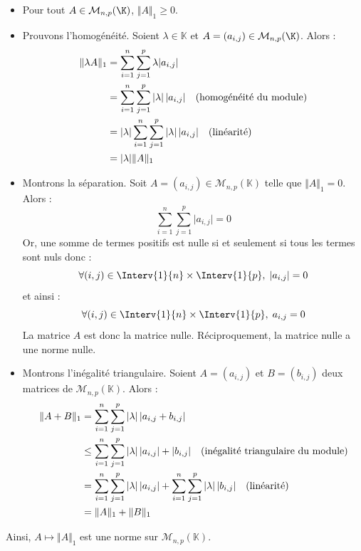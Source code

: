 \documentclass[a4paper,10pt]{report}
\begin{document}
\begin{itemize}
\item Pour tout $A \in \mathcal{M}_{n,p}(\K)$, $\Vert A \Vert_{1} \geq 0$.
\item Prouvons l'homogénéité. Soient $\lambda \in \mathbb{K}$ et $A=(a_{i,j}) \in \mathcal{M}_{n,p}(\K)$. Alors :
\begin{align*}
\Vert \lambda A \Vert_1 & = \sum_{i = 1}^{n} \sum_{j = 1}^{p} \lambda \vert a_{i,j} \vert \\
& = \sum_{i = 1}^{n} \sum_{j = 1}^{p} \vert \lambda \vert \, \vert a_{i,j} \vert \quad \hbox{(homogénéité du module)} \\
& = \vert \lambda \vert  \sum_{i = 1}^{n} \sum_{j = 1}^{p} \vert \lambda \vert \, \vert a_{i,j} \vert  \quad \hbox{(linéarité)} \\
& = \vert \lambda \vert \Vert A \Vert_1 
\end{align*}
\item Montrons la séparation. Soit $A=(a_{i,j}) \in \mathcal{M}_{n,p}(\mathbb{K})$ telle que $\Vert A \Vert_1=0$. Alors :
$$ \sum_{i = 1}^{n} \sum_{j = 1}^{p} \vert a_{i,j} \vert =0$$
Or, une somme de termes positifs est nulle si et seulement si tous les termes sont nuls donc :
$$ \forall (i,j) \in \Interv{1}{n} \times \Interv{1}{p}, \; \vert a_{i,j} \vert =0$$
et ainsi :
$$  \forall (i,j) \in \Interv{1}{n} \times \Interv{1}{p}, \;  a_{i,j}  =0$$
La matrice $A$ est donc la matrice nulle. Réciproquement, la matrice nulle a une norme nulle.
\item Montrons l'inégalité triangulaire. Soient $A=(a_{i,j})$ et $B=(b_{i,j})$ deux matrices de $\mathcal{M}_{n,p}(\mathbb{K})$. Alors :
\begin{align*}
\Vert A+B \Vert_1 & =  \sum_{i = 1}^{n} \sum_{j = 1}^{p} \vert \lambda \vert \, \vert a_{i,j} +b_{i,j} \vert  \\
& \leq \sum_{i = 1}^{n} \sum_{j = 1}^{p} \vert \lambda \vert \, \vert a_{i,j} \vert + \vert b_{i,j} \vert \quad \hbox{(inégalité triangulaire du module)}  \\
& = \sum_{i = 1}^{n} \sum_{j = 1}^{p} \vert \lambda \vert \, \vert a_{i,j} \vert  + \sum_{i = 1}^{n} \sum_{j = 1}^{p} \vert \lambda \vert \,  \vert b_{i,j} \vert \quad \hbox{(linéarité)} \\
& = \Vert A \Vert_1 + \Vert B \Vert_1 
\end{align*}
\end{itemize}
Ainsi, $A \mapsto \Vert A \Vert_1$ est une norme sur $\mathcal{M}_{n,p}(\mathbb{K})$.
\end{document}
